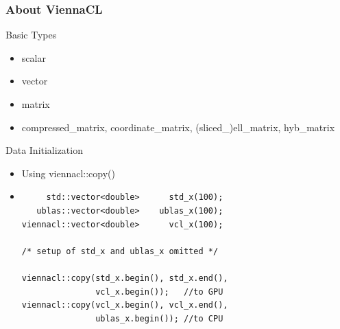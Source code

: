 \begin{frame}[fragile]
\frametitle{About ViennaCL}

 \begin{block}{Basic Types}
   \begin{itemize}
    \item scalar
    \item vector
    \item matrix
    \item compressed\_matrix, coordinate\_matrix, (sliced\_)ell\_matrix, hyb\_matrix
   \end{itemize}
 \end{block}

 \begin{block}{Data Initialization}
    \begin{itemize}
     \item Using viennacl::copy() 
    \item  { \black
  \begin{lstlisting}
     std::vector<double>      std_x(100);
   ublas::vector<double>    ublas_x(100);
viennacl::vector<double>      vcl_x(100);

/* setup of std_x and ublas_x omitted */

viennacl::copy(std_x.begin(), std_x.end(),
               vcl_x.begin());   //to GPU
viennacl::copy(vcl_x.begin(), vcl_x.end(),
               ublas_x.begin()); //to CPU
  \end{lstlisting} }

 \end{itemize}

 \end{block}
\end{frame}


